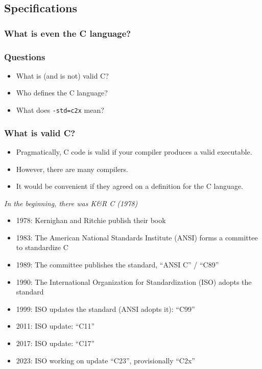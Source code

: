 \documentclass[12pt]{article}
\begin{document}
\subsection{Specifications}

\subsubsection{What is even the C language?}

\subsubsection{Questions}
\begin{itemize}
    \item What is (and is not) valid C?
    \item Who defines the C language?
    \item What does \texttt{-std=c2x} mean?
\end{itemize}


\subsubsection{What is valid C?}
\begin{itemize}
    \item Pragmatically, C code is valid if your compiler produces a valid executable.
    \item However, there are many compilers.
    \item It would be convenient if they agreed on a definition for the C language.
\end{itemize}

\textit{In the beginning, there was K\&R C (1978)}

\begin{itemize}
    \item 1978: Kernighan and Ritchie publish their book
    \item 1983: The American National Standards Institute (ANSI) forms a committee to standardize C
    \item 1989: The committee publishes the standard, ``ANSI C'' / ``C89''
    \item 1990: The International Organization for Standardization (ISO) adopts the standard
    \item 1999: ISO updates the standard (ANSI adopts it): ``C99''
    \item 2011: ISO update: ``C11''
    \item 2017: ISO update: ``C17''
    \item 2023: ISO working on update ``C23'', provisionally ``C2x''
\end{itemize}
\end{document}
